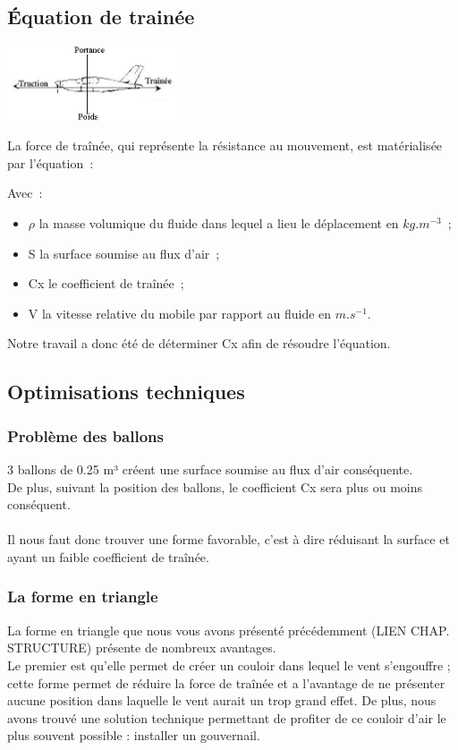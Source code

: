 \documentclass[a4paper,11pt]{article}
\begin{document}
\subsection{Équation de trainée}
	\begin{center}
		\includegraphics[width=5cm]{../Images/portance.jpg}
	\end{center}
	La force de traînée, qui représente la résistance au mouvement, est matérialisée par l'équation~:\\
  \begin{center}
  \end{center}
  Avec~:
  \begin{itemize}
   \item $\rho$ la masse volumique du fluide dans lequel a lieu le déplacement en $kg.m^{-3}$~;
   \item S la surface soumise au flux d'air~;
   \item Cx le coefficient de traînée~;
   \item V la vitesse relative du mobile par rapport au fluide en $m.s^{-1}$.
  \end{itemize}

		Notre travail a donc été de déterminer Cx afin de résoudre l'équation.
\subsection{Optimisations techniques}
\subsubsection{Problème des ballons}
	3 ballons de 0.25 m³ créent une surface soumise au flux d'air conséquente.\\
	De plus, suivant la position des ballons, le coefficient Cx sera plus ou moins conséquent.\\
	\\
	Il nous faut donc trouver une forme favorable, c'est à dire réduisant la surface et ayant un faible coefficient de traînée.

\subsubsection{La forme en triangle}
	La forme en triangle que nous vous avons présenté précédemment (LIEN CHAP. STRUCTURE) présente de nombreux avantages.
	\\
	Le premier est qu'elle permet de créer un couloir dans lequel le vent s'engouffre ; cette forme permet de réduire la force de traînée et a l'avantage de ne présenter aucune position dans laquelle le vent aurait un trop grand effet.
	De plus, nous avons trouvé une solution technique permettant de profiter de ce couloir d'air le plus souvent possible : installer un gouvernail.
\end{document}
